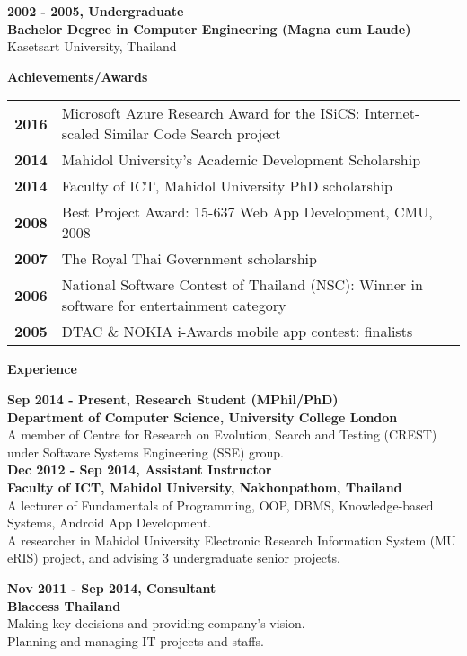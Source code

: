 \documentclass[a4paper,12pt,final]{memoir}
\newcommand{\Sep}{\vspace{1.5em}}
\newcommand{\SmallSep}{\vspace{0.5em}}
\newcommand{\CVSection}[1]
	{\Large\textbf{#1}\par
	\SmallSep\normalsize\normalfont}
\newcommand{\CVItem}[1]
	{\textbf{\color{RoyalBlue} #1}}
\begin{document}
\SmallSep

\CVItem{2002 - 2005, Undergraduate}\\
\textbf{Bachelor Degree in Computer Engineering (Magna cum Laude)}\\
Kasetsart University, Thailand
\SmallSep
\Sep

\CVSection{Achievements/Awards}
\begin{tabular}{lp{11.5cm}}
	\CVItem{2016} & Microsoft Azure Research Award for the ISiCS: Internet-scaled Similar Code Search project \\ 
	\CVItem{2014} & Mahidol University’s Academic Development Scholarship \\
	\CVItem{2014} & Faculty of ICT, Mahidol University PhD scholarship \\
	\CVItem{2008} & Best Project Award: 15-637 Web App Development, CMU, 2008 \\
	\CVItem{2007} & The Royal Thai Government scholarship \\
	\CVItem{2006} & National Software Contest of Thailand (NSC): Winner in software for entertainment category \\ 
	\CVItem{2005} & DTAC \& NOKIA i-Awards mobile app contest: finalists
\end{tabular} 
\SmallSep
\Sep

\CVSection{Experience}
\CVItem{Sep 2014 - Present, Research Student (MPhil/PhD)}\\
\textbf{Department of Computer Science, University College London}\\
A member of Centre for Research on Evolution, Search and Testing (CREST) under Software Systems Engineering (SSE) group. \\

\CVItem{Dec 2012 - Sep 2014, Assistant Instructor}\\
\textbf{Faculty of ICT, Mahidol University, Nakhonpathom, Thailand}\\
A lecturer of Fundamentals of Programming, OOP, DBMS, Knowledge-based Systems, Android App Development.\\ 
A researcher in Mahidol University Electronic Research Information System (MU eRIS) project, and advising 3 undergraduate senior projects. \\

\SmallSep

\CVItem{Nov 2011 - Sep 2014, Consultant}\\
\textbf{Blaccess Thailand}\\
Making key decisions and providing company's vision.\\
Planning and managing IT projects and staffs.
\end{document}

